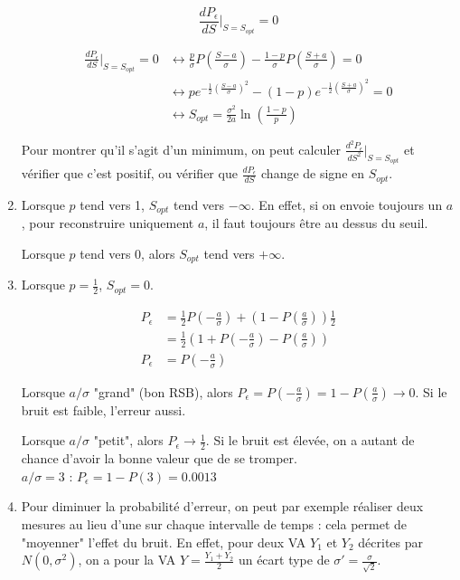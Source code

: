 \documentclass[main.tex]{subfiles}
\begin{document}
\begin{enumerate}
\[ \frac{dP_{\epsilon}}{dS}|_{S=S_{opt}} =0 \]

\begin{align*}
\frac{dP_{\epsilon}}{dS}|_{S=S_{opt}} =0 & \leftrightarrow \frac{p}{\sigma}P(\frac{S-a}{\sigma}) - \frac{1-p}{\sigma}P(\frac{S+a}{\sigma}) = 0 \\
& \leftrightarrow pe^{-\frac{1}{2}(\frac{S-a}{\sigma})^2} - (1-p)e^{-\frac{1}{2}(\frac{S+a}{\sigma})^2} = 0 \\
& \leftrightarrow S_{opt} = \frac{\sigma^2}{2a}\ln(\frac{1-p}{p})
\end{align*}

Pour montrer qu'il s'agit d'un minimum, on peut calculer $\frac{d^2P_{\epsilon}}{dS^2}|_{S=S_{opt}}$ et vérifier que c'est positif, ou vérifier que $\frac{dP_{\epsilon}}{dS}$ change de signe en $S_{opt}$.

\item Lorsque $p$ tend vers 1, $S_{opt}$ tend vers $-\infty$. En effet, si on envoie toujours un $a$, pour reconstruire uniquement $a$, il faut toujours être au dessus du seuil.

Lorsque $p$ tend vers 0, alors $S_{opt}$ tend vers $+\infty$.

\item Lorsque $p=\frac{1}{2}$, $S_{opt} = 0$.

\begin{align*}
P_{\epsilon} & = \frac{1}{2}P(-\frac{a}{\sigma}) + (1-P(\frac{a}{\sigma}))\frac{1}{2} \\
& = \frac{1}{2}(1+P(-\frac{a}{\sigma})-P(\frac{a}{\sigma}))\\
P_{\epsilon} & = P(-\frac{a}{\sigma})
\end{align*}

Lorsque $a/\sigma$ "grand" (bon RSB), alors $P_{\epsilon} = P(-\frac{a}{\sigma}) = 1 - P(\frac{a}{\sigma}) \rightarrow 0$. Si le bruit est faible, l'erreur aussi.

Lorsque $a/\sigma$ "petit", alors $P_{\epsilon} \rightarrow \frac{1}{2}$. Si le bruit est élevée, on a autant de chance d'avoir la bonne valeur que de se tromper.\\

$a/\sigma=3$ : $P_{\epsilon} = 1 - P(3) = 0.0013$

\item Pour diminuer la probabilité d'erreur, on peut par exemple réaliser deux mesures au lieu d'une sur chaque intervalle de temps : cela permet de "moyenner" l'effet du bruit. En effet, pour deux VA $Y_1$ et $Y_2$ décrites par $N(0,\sigma^2)$, on a pour la VA $Y=\frac{Y_1+Y_2}{2}$ un écart type de $\sigma' = \frac{\sigma}{\sqrt{2}}$.
\end{enumerate}
\end{document}

